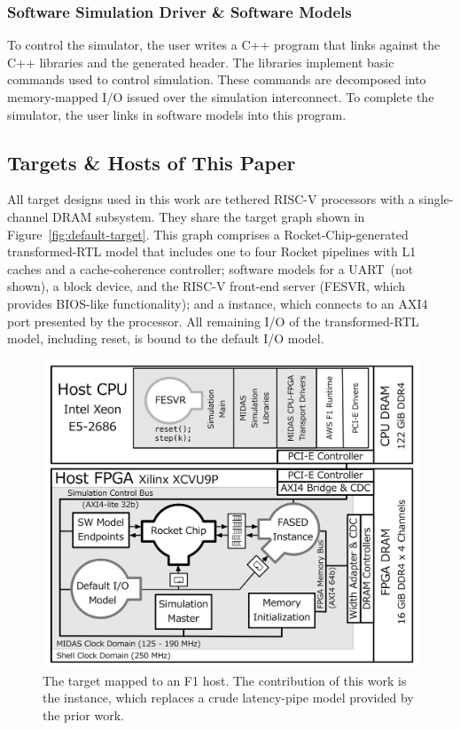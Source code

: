 \subsubsection{Software Simulation Driver \& Software Models}
To control the simulator, the user writes a C++ program that links against the
\SIMNAME C++ libraries and the generated header. The \SIMNAME libraries implement
basic commands used to control simulation.  These commands are decomposed into
memory-mapped I/O issued over the simulation interconnect.  To complete
the simulator, the user links in software models into this program.

\subsection{Targets \& Hosts of This Paper}\label{sec:targetandhostmachines}

All target designs used in this work are tethered RISC-V processors with a
single-channel DRAM subsystem.  They share the target graph shown in
Figure~\ref{fig:default-target}. This graph comprises a Rocket-Chip-generated
transformed-RTL model that includes one to four Rocket pipelines with L1 caches
and a cache-coherence controller; software models for a UART~(not shown),
a block device, and the RISC-V front-end server
(FESVR, which provides BIOS-like functionality); and a \PNAME instance,
which connects to an AXI4 port presented by the processor.  All remaining I/O
of the transformed-RTL model, including reset, is bound to the default I/O
model.

\begin{figure}[t]
\vspace{-0.1in}
    \centering
    \includegraphics[width=\columnwidth]{figures/mapped-simulator.pdf}
    \vspace{-0.25in}
    \caption{The target mapped to an F1 host. The contribution of this work is
    the \PNAME instance, which replaces a crude latency-pipe model provided
    by the prior work.}
    \label{fig:mapped-simulator}
\vspace{-0.10in}
\end{figure}

